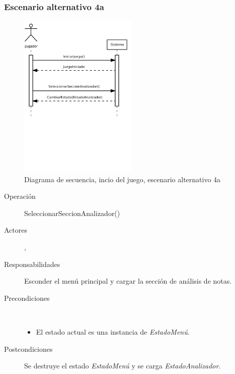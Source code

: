 \subsubsection{Escenario alternativo 4a}
\begin{figure}[h!]
  \centering
  \includegraphics[trim=0cm 10cm 0cm 0cm, clip=true, width=0.5\textwidth]{4_analisis/diagsec_caso1_esc2}
  \caption{Diagrama de secuencia, incio del juego, escenario alternativo 4a}
\end{figure}

\begin{description}
\item[Operación] SeleccionarSeccionAnalizador()
\item[Actores] \jugador, \sistema
\item[Responsabilidades] Esconder el menú principal y cargar la sección de
  análisis de notas.
\item[Precondiciones] $\quad$
  \begin{itemize}
  \item El estado actual es una instancia de \textit{EstadoMenú}.
  \end{itemize}
\item[Postcondiciones] Se destruye el estado \textit{EstadoMenú} y se carga
  \textit{EstadoAnalizador}.
\end{description}

